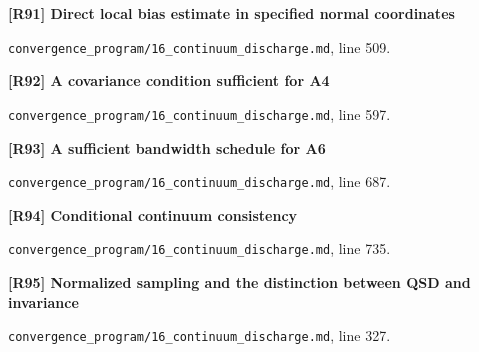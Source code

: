 \documentclass[11pt,a4paper]{article}
\begin{document}
\par\medskip\noindent\begin{minipage}{\linewidth}\textbf{[R91] Direct local bias estimate in specified normal coordinates}\label{src:lem-continuum-local-bias}\par
{\small\texttt{}\par
\nolinkurl{convergence_program/16_continuum_discharge.md}, line 509.\par}
\end{minipage}\par

\par\medskip\noindent\begin{minipage}{\linewidth}\textbf{[R92] A covariance condition sufficient for A4}\label{src:lem-continuum-a4-mixing}\par
{\small\texttt{}\par
\nolinkurl{convergence_program/16_continuum_discharge.md}, line 597.\par}
\end{minipage}\par

\par\medskip\noindent\begin{minipage}{\linewidth}\textbf{[R93] A sufficient bandwidth schedule for A6}\label{src:lem-continuum-a6-scaling}\par
{\small\texttt{}\par
\nolinkurl{convergence_program/16_continuum_discharge.md}, line 687.\par}
\end{minipage}\par

\par\medskip\noindent\begin{minipage}{\linewidth}\textbf{[R94] Conditional continuum consistency}\label{src:cor-continuum-consistency-conditional}\par
{\small\texttt{}\par
\nolinkurl{convergence_program/16_continuum_discharge.md}, line 735.\par}
\end{minipage}\par

\par\medskip\noindent\begin{minipage}{\linewidth}\textbf{[R95] Normalized sampling and the distinction between QSD and invariance}\label{src:lem-continuum-a3-qsd-sampling}\par
{\small\texttt{}\par
\nolinkurl{convergence_program/16_continuum_discharge.md}, line 327.\par}
\end{minipage}\par
\end{document}
